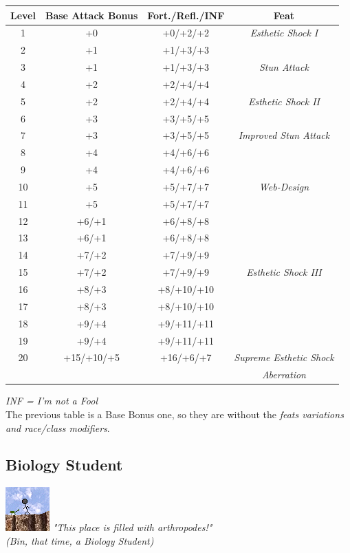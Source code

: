 \documentclass[ letterpaper,12pt]{article}
\begin{document}
\begin{center} \begin{tabular}{|c||c|c|c|}
\hline
{\bf Level}&{\bf Base Attack Bonus}&{\bf Fort./Refl./INF}&{\bf Feat}\\
\hline
1&+0&+0/+2/+2&{\it Esthetic Shock I}\\
\hline
2&+1&+1/+3/+3&\\
\hline
3&+1&+1/+3/+3&{\it Stun Attack}\\
\hline
4&+2&+2/+4/+4&\\
\hline
5&+2&+2/+4/+4&{\it Esthetic Shock II}\\
\hline
6&+3&+3/+5/+5&\\
\hline
7&+3&+3/+5/+5&{\it Improved Stun Attack}\\
\hline
8&+4&+4/+6/+6&\\
\hline
9&+4&+4/+6/+6&\\
\hline
10&+5&+5/+7/+7&{\it Web-Design}\\
\hline
11&+5&+5/+7/+7&\\
\hline
12&+6/+1&+6/+8/+8&\\
\hline
13&+6/+1&+6/+8/+8&\\
\hline
14&+7/+2&+7/+9/+9&\\
\hline
15&+7/+2&+7/+9/+9&{\it Esthetic Shock III }\\
\hline
16&+8/+3&+8/+10/+10&\\
\hline
17&+8/+3&+8/+10/+10&\\
\hline
18&+9/+4&+9/+11/+11&\\
\hline
19&+9/+4&+9/+11/+11&\\
\hline
20&+15/+10/+5&+16/+6/+7&{\it Supreme Esthetic Shock}\\
&&&{\it Aberration}\\
\hline
\end{tabular} \end{center}

{\it *INF = I'm not a Fool}\\

The previous table is a Base Bonus one, so they are without the {\it feats variations and race/class modifiers}.\\

\subsection{Biology Student}
\includegraphics{../data/classes/Img/biologia.png}
{\it "This place is filled with arthropodes!"\\(Bin, that time, a Biology Student)}\\
\end{document}
